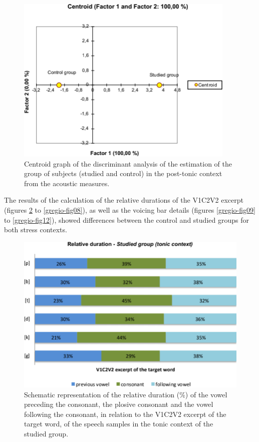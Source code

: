 \begin{figure}
\centering
\includegraphics[width=0.7\linewidth]{imgs/gregio-image4.png}
\caption{Centroid graph of the discriminant analysis of the estimation of the group of subjects (studied and control) in the post-tonic context from the acoustic measures.} 
\label{gregio-fig04}
\end{figure}

The results of the calculation of the relative durations of the V1C2V2 excerpt
(figures \ref{gregio-fig05} to \ref{gregio-fig08}), as well as the voicing bar details (figures \ref{gregio-fig09} to \ref{gregio-fig12}), showed
differences between the control and studied groups for both stress contexts.

\begin{figure}
\centering
\includegraphics[width=0.9\linewidth]{imgs/gregio-image5.png}
\caption{Schematic representation of the relative duration (\%) of the vowel preceding the consonant, the plosive consonant and the vowel following the consonant, in relation to the V1C2V2 excerpt of the target word, of the speech samples in the tonic context of the studied group.} 
\label{gregio-fig05}
\end{figure}

